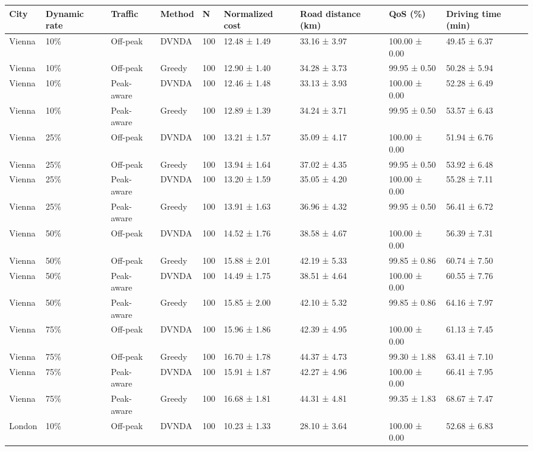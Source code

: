 \begin{tabular}{lllllllll}
\hline
City & Dynamic rate & Traffic & Method & N & Normalized cost & Road distance (km) & QoS (\%) & Driving time (min) \\
\hline
Vienna & 10\% & Off-peak & DVNDA & 100 & 12.48 ± 1.49 & 33.16 ± 3.97 & 100.00 ± 0.00 & 49.45 ± 6.37 \\
Vienna & 10\% & Off-peak & Greedy & 100 & 12.90 ± 1.40 & 34.28 ± 3.73 & 99.95 ± 0.50 & 50.28 ± 5.94 \\
Vienna & 10\% & Peak-aware & DVNDA & 100 & 12.46 ± 1.48 & 33.13 ± 3.93 & 100.00 ± 0.00 & 52.28 ± 6.49 \\
Vienna & 10\% & Peak-aware & Greedy & 100 & 12.89 ± 1.39 & 34.24 ± 3.71 & 99.95 ± 0.50 & 53.57 ± 6.43 \\
Vienna & 25\% & Off-peak & DVNDA & 100 & 13.21 ± 1.57 & 35.09 ± 4.17 & 100.00 ± 0.00 & 51.94 ± 6.76 \\
Vienna & 25\% & Off-peak & Greedy & 100 & 13.94 ± 1.64 & 37.02 ± 4.35 & 99.95 ± 0.50 & 53.92 ± 6.48 \\
Vienna & 25\% & Peak-aware & DVNDA & 100 & 13.20 ± 1.59 & 35.05 ± 4.20 & 100.00 ± 0.00 & 55.28 ± 7.11 \\
Vienna & 25\% & Peak-aware & Greedy & 100 & 13.91 ± 1.63 & 36.96 ± 4.32 & 99.95 ± 0.50 & 56.41 ± 6.72 \\
Vienna & 50\% & Off-peak & DVNDA & 100 & 14.52 ± 1.76 & 38.58 ± 4.67 & 100.00 ± 0.00 & 56.39 ± 7.31 \\
Vienna & 50\% & Off-peak & Greedy & 100 & 15.88 ± 2.01 & 42.19 ± 5.33 & 99.85 ± 0.86 & 60.74 ± 7.50 \\
Vienna & 50\% & Peak-aware & DVNDA & 100 & 14.49 ± 1.75 & 38.51 ± 4.64 & 100.00 ± 0.00 & 60.55 ± 7.76 \\
Vienna & 50\% & Peak-aware & Greedy & 100 & 15.85 ± 2.00 & 42.10 ± 5.32 & 99.85 ± 0.86 & 64.16 ± 7.97 \\
Vienna & 75\% & Off-peak & DVNDA & 100 & 15.96 ± 1.86 & 42.39 ± 4.95 & 100.00 ± 0.00 & 61.13 ± 7.45 \\
Vienna & 75\% & Off-peak & Greedy & 100 & 16.70 ± 1.78 & 44.37 ± 4.73 & 99.30 ± 1.88 & 63.41 ± 7.10 \\
Vienna & 75\% & Peak-aware & DVNDA & 100 & 15.91 ± 1.87 & 42.27 ± 4.96 & 100.00 ± 0.00 & 66.41 ± 7.95 \\
Vienna & 75\% & Peak-aware & Greedy & 100 & 16.68 ± 1.81 & 44.31 ± 4.81 & 99.35 ± 1.83 & 68.67 ± 7.47 \\
London & 10\% & Off-peak & DVNDA & 100 & 10.23 ± 1.33 & 28.10 ± 3.64 & 100.00 ± 0.00 & 52.68 ± 6.83 \\

\end{tabular}
